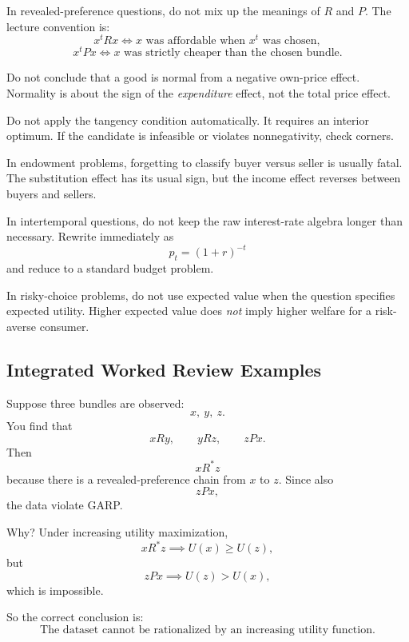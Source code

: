 \begin{commonmistake}
In revealed-preference questions, do not mix up the meanings of $R$ and $P$. The lecture convention is:
\[
x^t R x \iff x \text{ was affordable when } x^t \text{ was chosen},
\]
\[
x^t P x \iff x \text{ was strictly cheaper than the chosen bundle}.
\]
\end{commonmistake}

\begin{commonmistake}
Do not conclude that a good is normal from a negative own-price effect. Normality is about the sign of the \emph{expenditure} effect, not the total price effect.
\end{commonmistake}

\begin{commonmistake}
Do not apply the tangency condition automatically. It requires an interior optimum. If the candidate is infeasible or violates nonnegativity, check corners.
\end{commonmistake}

\begin{commonmistake}
In endowment problems, forgetting to classify buyer versus seller is usually fatal. The substitution effect has its usual sign, but the income effect reverses between buyers and sellers.
\end{commonmistake}

\begin{commonmistake}
In intertemporal questions, do not keep the raw interest-rate algebra longer than necessary. Rewrite immediately as
\[
p_t=(1+r)^{-t}
\]
and reduce to a standard budget problem.
\end{commonmistake}

\begin{commonmistake}
In risky-choice problems, do not use expected value when the question specifies expected utility. Higher expected value does \emph{not} imply higher welfare for a risk-averse consumer.
\end{commonmistake}

\subsection{Integrated Worked Review Examples}

\begin{examplebox}[title={Worked Review Example 1: GARP logic from a chain of choices}]
Suppose three bundles are observed:
\[
x,\ y,\ z.
\]
You find that
\[
x R y,
\qquad
y R z,
\qquad
z P x.
\]
Then
\[
x R^* z
\]
because there is a revealed-preference chain from $x$ to $z$. Since also
\[
z P x,
\]
the data violate GARP.

Why? Under increasing utility maximization,
\[
x R^* z \implies U(x)\ge U(z),
\]
but
\[
z P x \implies U(z)>U(x),
\]
which is impossible.

So the correct conclusion is:
\[
\boxed{\text{The dataset cannot be rationalized by an increasing utility function.}}
\]
\end{examplebox}

